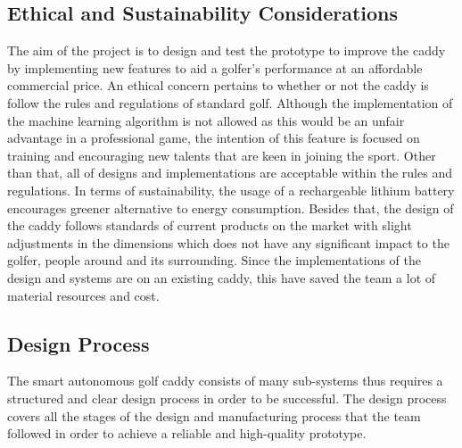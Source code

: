 \documentclass[11pt,landscape]{article}
\begin{document}
\begin{multicols}{3}
\subsection{Ethical and Sustainability Considerations}
The aim of the project is to design and test the prototype to improve the caddy
by implementing new features to aid a golfer’s performance at an affordable
commercial price. An ethical concern pertains to whether or not the caddy is
follow the rules and regulations of standard golf. Although the implementation
of the machine learning algorithm is not allowed as this would be an unfair
advantage in a professional game, the intention of this feature is focused on
training and encouraging new talents that are keen in joining the sport. Other
than that, all of designs and implementations are acceptable within the rules
and regulations. In terms of sustainability, the usage of a rechargeable lithium
battery encourages greener alternative to energy consumption. Besides that, the
design of the caddy follows standards of current products on the market with
slight adjustments in the dimensions which does not have any significant impact
to the golfer, people around and its surrounding. Since the implementations of
the design and systems are on an existing caddy, this have saved the team a lot
of material resources and cost.  

\subsection{Design Process}
The smart autonomous golf caddy consists of many sub-systems thus requires a
structured and clear design process in order to be successful. The design
process covers all the stages of the design and manufacturing process that the
team followed in order to achieve a reliable and high-quality prototype.


\end{multicols}
\end{document}
